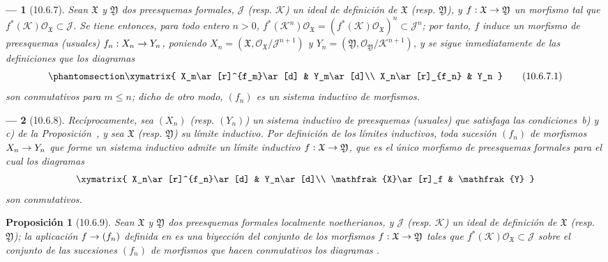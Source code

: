 \documentclass[oneside]{amsart}
\theoremstyle{ega-env-style}
\newtheorem*{env}{---}
\theoremstyle{ega-thm-env-style}
\newtheorem*{proposition}{Proposición}
\theoremstyle{ega-defn-env-style}
\def\leq{\leqslant}                 %
\renewcommand{\to}{\mathchoice{\longrightarrow}{\rightarrow}{\rightarrow}{\rightarrow}}
\newcommand{\oldpage}[2][]{{\marginnote{\normalfont{\textbf{#1}~|~#2}}}\ignorespaces}
\let\EGAOriginalLabel\label
\renewcommand{\label}[1]{\phantomsection\EGAOriginalLabel{#1}}
\begin{document}
\begin{env}[10.6.7]
\label{I.10.6.7}
Sean $\mathfrak{X}$ y $\mathfrak{Y}$ dos preesquemas formales, $\mathscr{J}$ (resp. $\mathscr{K}$) un ideal de definición de $\mathfrak{X}$ (resp. $\mathfrak{Y}$), y $f:\mathfrak{X}\to\mathfrak{Y}$ un morfismo tal que $f^*(\mathscr{K})\mathscr{O}_{\mathfrak{X}}\subset\mathscr{J}$.
Se tiene entonces, para todo entero $n>0$, $f^*(\mathscr{K}^n)\mathscr{O}_{\mathfrak{X}}
=(f^*(\mathscr{K})\mathscr{O}_{\mathfrak{X}})^n
\subset\mathscr{J}^n$; por tanto, $f$ induce  un morfismo de preesquemas (usuales) $f_n:X_n\to Y_n$, poniendo $X_n=(\mathfrak{X},
\mathscr{O}_{\mathfrak{X}}/\mathscr{J}^{n+1})$ y $Y_n=(\mathfrak{Y},
\mathscr{O}_{\mathfrak{Y}}/\mathscr{K}^{n+1})$, y se sigue inmediatamente de las definiciones que los diagramas
\[
  \label{I.10.6.7.1-fr}
  \xymatrix{
    X_m\ar[r]^{f_m}\ar[d] &
    Y_m\ar[d]\\
    X_n\ar[r]_{f_n} &
    Y_n
  }
  \tag{10.6.7.1}
\]
\oldpage[I]{192}
son conmutativos para $m\leq n$; dicho de otro modo, $(f_n)$ es un \emph{sistema inductivo} de morfismos.
\end{env}

\begin{env}[10.6.8]
\label{I.10.6.8}
Recíprocamente, sea $(X_n)$ (resp. $(Y_n)$) un sistema inductivo de preesquemas (usuales) que satisfaga las condiciones~\emph{b)} y \emph{c)} de la Proposición~, y sea $\mathfrak{X}$ (resp. $\mathfrak{Y}$) su límite inductivo.
Por definición de los límites inductivos, toda sucesión $(f_n)$ de morfismos $X_n\to Y_n$ que forme un sistema inductivo admite un \emph{límite inductivo $f:\mathfrak{X}\to\mathfrak{Y}$}, que es el único morfismo de preesquemas formales para el cual los diagramas
\[
  \xymatrix{
    X_n\ar[r]^{f_n}\ar[d] &
    Y_n\ar[d]\\
    \mathfrak{X}\ar[r]_f &
    \mathfrak{Y}
  }
\]
son conmutativos.
\end{env}

\begin{proposition}[10.6.9]
\label{I.10.6.9}
Sean $\mathfrak{X}$ y $\mathfrak{Y}$ dos preesquemas formales localmente noetherianos, y $\mathscr{J}$ \textup{(resp. $\mathscr{K}$)} un ideal de definición de $\mathfrak{X}$ \textup{(resp. $\mathfrak{Y}$)}; la aplicación $f\to(f_n)$ definida en  es una biyección del conjunto de los morfismos $f:\mathfrak{X}\to\mathfrak{Y}$ tales que $f^*(\mathscr{K})\mathscr{O}_{\mathfrak{X}}\subset\mathscr{J}$ sobre el conjunto de las sucesiones $(f_n)$ de morfismos que hacen conmutativos los diagramas .
\end{proposition}
\end{document}
